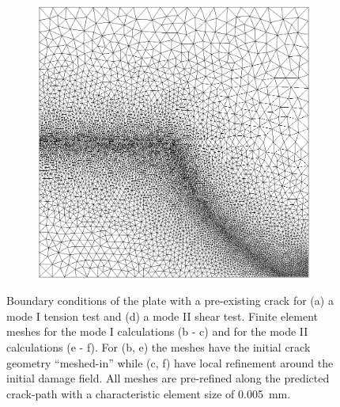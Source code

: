 \begin{figure}[htb!]
\begin{subfigure}[b]{0.19\textwidth}
    \caption{}
    \label{fig: Chapter4/mode2_notch_mesh}
  \end{subfigure}
  \hspace{0.05\textwidth}
  \begin{subfigure}[b]{0.19\textwidth}
    \centering
    \includegraphics[width=\textwidth]{Chapter4/figures/mode2_initial_mesh.png}
    \caption{}
    \label{fig: Chapter4/mode2_initial_mesh}
  \end{subfigure}
  \caption{Boundary conditions of the plate with a pre-existing crack for (a) a mode I tension test and (d) a mode II shear test. Finite element meshes for the mode I calculations (b - c) and for the mode II calculations (e - f). For (b, e) the meshes have the initial crack geometry ``meshed-in'' while (c, f) have local refinement around the initial damage field. All meshes are pre-refined along the predicted crack-path with a characteristic element size of \SI{0.005}{\milli\meter}.}
  \label{fig: example/bcs}
\end{figure}
